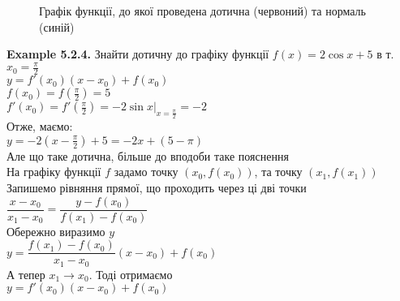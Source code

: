 \documentclass[a4paper, 14pt]{extarticle}
\def\huge{\displaystyle}
\def\bigline{\vspace{5mm}\\}
\def\ex#1{\textbf{Example {#1}}}
\def\bigline{\vspace{5mm}\\}
\begin{document}
\begin{figure}
\centering
{}
	\captionsetup{justification=centering}
	\caption{Графік функції, до якої проведена дотична (червоний) та нормаль (синій)}
\end{figure}
\ex{5.2.4.} Знайти дотичну до графіку функції $f(x) = 2 \cos x + 5$ в т. $x_0 = \huge \frac{\pi}{2}$\\
$y = f'(x_0)(x-x_0)+f(x_0)$\\
$f(x_0) = \huge f(\frac{\pi}{2}) = 5$\\
$f'(x_0) = \huge f'(\frac{\pi}{2}) = -2 \sin x |_{x = \frac{\pi}{2}} = -2$\\
Отже, маємо:\\
$y = \huge -2(x-\frac{\pi}{2}) + 5 = -2x + (5 - \pi)$
\bigline
Але що таке дотична, більше до вподоби таке пояснення\\
На графіку функції $f$ задамо точку $(x_0,f(x_0))$, та точку $(x_1,f(x_1))$\\
Запишемо рівняння прямої, що проходить через ці дві точки\\
$\dfrac{x-x_0}{x_1-x_0} = \dfrac{y-f(x_0)}{f(x_1)-f(x_0)}$\\
Обережно виразимо $y$\\
$y = \dfrac{f(x_1)-f(x_0)}{x_1-x_0} (x-x_0) + f(x_0)$\\
А тепер $x_1 \to x_0$. Тоді отримаємо\\
$y = f'(x_0)(x-x_0) + f(x_0)$
\bigline
\end{document}
